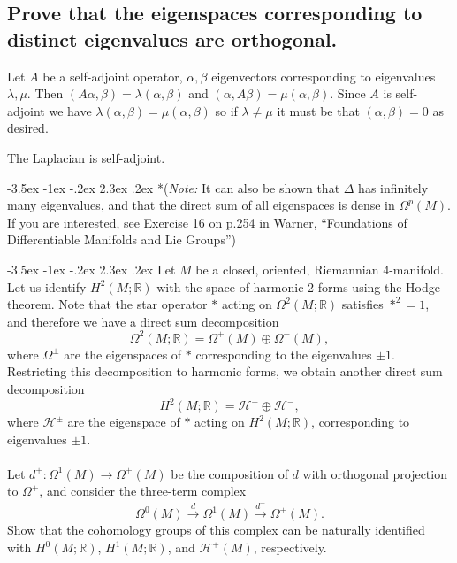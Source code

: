 \documentclass[10pt]{article}
\makeatletter
\renewcommand\section{\@startsection{section}{1}{\z@}%
                                  {-3.5ex \@plus -1ex \@minus -.2ex}%
                                  {2.3ex \@plus.2ex}%
                                  {\normalfont\large\bfseries}}
\newcommand{\R}{\ensuremath{\mathbb{R}}}
\DeclareMathOperator{\2}{II}
\newcommand{\note}[1]{{(\emph{Note:} #1)}} %
\makeatother
\begin{document}
\subsection{Prove that the eigenspaces corresponding to distinct eigenvalues are orthogonal.}\label{orthog}
Let $A$ be a self-adjoint operator, $\alpha, \beta$ eigenvectors corresponding to eigenvalues $\lambda, \mu$. Then $(A \alpha, \beta) = \lambda ( \alpha, \beta)$ and $(\alpha, A \beta) = \mu (\alpha, \beta)$. Since $A$ is self-adjoint we have $\lambda(\alpha, \beta) = \mu(\alpha, \beta)$ so if $\lambda \neq \mu$ it must be that  $(\alpha, \beta)=0$ as desired. 

The Laplacian is self-adjoint.

\section*{\note{It can also be shown that $\Delta$ has infinitely many eigenvalues, and that the direct sum of all eigenspaces is dense in $\Omega^p(M)$. If you are interested, see Exercise 16 on p.254 in Warner, ``Foundations of Differentiable Manifolds and Lie Groups''}}

\section{Let $M$ be a closed, oriented, Riemannian 4-manifold. Let us identify $H^2(M; \R)$ with the space of harmonic 2-forms using the Hodge theorem. Note that the star operator $*$ acting on $\Omega^2(M; \R)$ satisfies $*^2 =1$, and therefore we have a direct sum decomposition $$\Omega^2(M; \R) = \Omega^+(M) \oplus \Omega^- (M),$$ where $\Omega^\pm$ are the eigenspaces of $*$ corresponding to the eigenvalues $\pm 1$. Restricting this decomposition to harmonic forms, we obtain another direct sum decomposition $$H^2(M; \R) = \mathcal{H}^+ \oplus \mathcal{H}^-,$$ where $\mathcal{H}^\pm$ are the eigenspace of $*$ acting on $H^2(M; \R)$, corresponding to eigenvalues $\pm 1$. \\\\ Let $d^+ : \Omega^1(M) \to \Omega^+(M)$ be the composition of $d$ with orthogonal projection to $\Omega^+$, and consider the three-term complex $$\Omega^0(M) \stackrel{d}{\to} \Omega^1(M) \stackrel{d^+}{\to} \Omega^+(M).$$ Show that the cohomology groups of this complex can be naturally identified with $H^0(M; \R)$, $H^1(M; \R)$, and $\mathcal{H}^+(M)$, respectively.}
\end{document}
